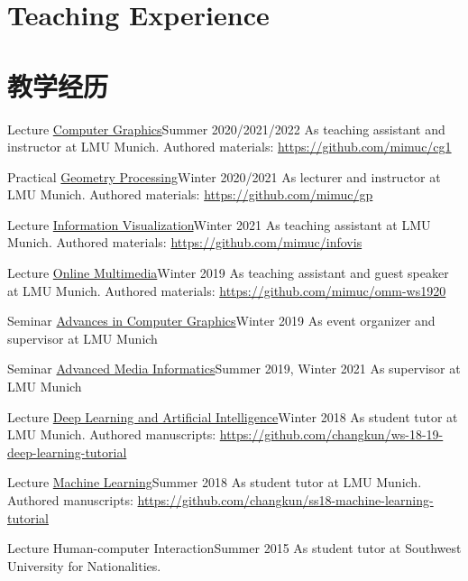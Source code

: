  {
\section{\textbf{Teaching Experience}}
}{
\section{\textbf{教学经历}}
}
\small
\resumeSubHeadingListStartNoLabel

\resumeSubheading
{Lecture \href{http://www.medien.ifi.lmu.de/lehre/ss22/cg1/}{Computer Graphics}}{Summer 2020/2021/2022}
{As teaching assistant and instructor at LMU Munich. Authored materials: \url{https://github.com/mimuc/cg1}}{}

\resumeSubheading
{Practical \href{https://www.medien.ifi.lmu.de/lehre/ws2122/gp/}{Geometry Processing}}{Winter 2020/2021}
{As lecturer and instructor at LMU Munich. Authored materials: \url{https://github.com/mimuc/gp}}{}

\resumeSubheading
{Lecture \href{https://www.medien.ifi.lmu.de/lehre/ws2122/iv/}{Information Visualization}}{Winter 2021}
{As teaching assistant at LMU Munich. Authored materials: \url{https://github.com/mimuc/infovis}}{}

\resumeSubheading
{Lecture \href{http://www.medien.ifi.lmu.de/lehre/ws1920/omm/}{Online Multimedia}}{Winter 2019}
{As teaching assistant and guest speaker at LMU Munich. Authored materials: \url{https://github.com/mimuc/omm-ws1920}}{}

\resumeSubheading
{Seminar \href{http://www.medien.ifi.lmu.de/lehre/ws1920/hs/}{Advances in Computer Graphics}}{Winter 2019}
{As event organizer and supervisor at LMU Munich}{}

\resumeSubheading
{Seminar \href{http://www.medien.ifi.lmu.de/lehre/ws2122/hs/}{Advanced Media Informatics}}{Summer 2019, Winter 2021}
{As supervisor at LMU Munich}{}

\resumeSubheading
{Lecture \href{http://www.dbs.ifi.lmu.de/cms/studium_lehre/lehre_master/deep1819/index.html}{Deep Learning and Artificial Intelligence}}{Winter 2018}
{As student tutor at LMU Munich. Authored manuscripts: \url{https://github.com/changkun/ws-18-19-deep-learning-tutorial}}{}

\resumeSubheading
{Lecture \href{http://www.dbs.ifi.lmu.de/cms/studium_lehre/lehre_master/ml18/index.html}{Machine Learning}}{Summer 2018}
{As student tutor at LMU Munich. Authored manuscripts: \url{https://github.com/changkun/ss18-machine-learning-tutorial}}{}


\resumeSubheading
{Lecture Human-computer Interaction}{Summer 2015}
{As student tutor at Southwest University for Nationalities.}{}
\resumeSubHeadingListEnd